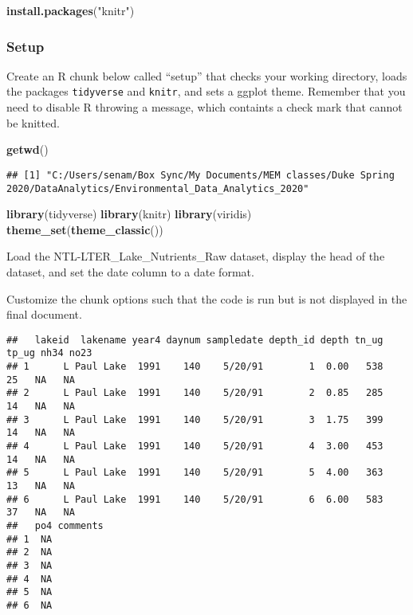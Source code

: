 \documentclass[
]{article}
\newenvironment{Shaded}{\begin{snugshade}}{\end{snugshade}}
\newcommand{\KeywordTok}[1]{\textcolor[rgb]{0.13,0.29,0.53}{\textbf{#1}}}
\newcommand{\NormalTok}[1]{#1}
\newcommand{\StringTok}[1]{\textcolor[rgb]{0.31,0.60,0.02}{#1}}
\begin{document}
\begin{Shaded}
\begin{Highlighting}[]
\KeywordTok{install.packages}\NormalTok{(}\StringTok{"knitr"}\NormalTok{)}
\end{Highlighting}
\end{Shaded}

\hypertarget{setup}{%
\subsubsection{Setup}\label{setup}}

Create an R chunk below called ``setup'' that checks your working
directory, loads the packages \texttt{tidyverse} and \texttt{knitr}, and
sets a ggplot theme. Remember that you need to disable R throwing a
message, which containts a check mark that cannot be knitted.

\begin{Shaded}
\begin{Highlighting}[]
\KeywordTok{getwd}\NormalTok{()}
\end{Highlighting}
\end{Shaded}

\begin{verbatim}
## [1] "C:/Users/senam/Box Sync/My Documents/MEM classes/Duke Spring 2020/DataAnalytics/Environmental_Data_Analytics_2020"
\end{verbatim}

\begin{Shaded}
\begin{Highlighting}[]
\KeywordTok{library}\NormalTok{(tidyverse)}
\KeywordTok{library}\NormalTok{(knitr)}
\KeywordTok{library}\NormalTok{(viridis)}
\KeywordTok{theme_set}\NormalTok{(}\KeywordTok{theme_classic}\NormalTok{())}
\end{Highlighting}
\end{Shaded}

Load the NTL-LTER\_Lake\_Nutrients\_Raw dataset, display the head of the
dataset, and set the date column to a date format.

Customize the chunk options such that the code is run but is not
displayed in the final document.

\begin{verbatim}
##   lakeid  lakename year4 daynum sampledate depth_id depth tn_ug tp_ug nh34 no23
## 1      L Paul Lake  1991    140    5/20/91        1  0.00   538    25   NA   NA
## 2      L Paul Lake  1991    140    5/20/91        2  0.85   285    14   NA   NA
## 3      L Paul Lake  1991    140    5/20/91        3  1.75   399    14   NA   NA
## 4      L Paul Lake  1991    140    5/20/91        4  3.00   453    14   NA   NA
## 5      L Paul Lake  1991    140    5/20/91        5  4.00   363    13   NA   NA
## 6      L Paul Lake  1991    140    5/20/91        6  6.00   583    37   NA   NA
##   po4 comments
## 1  NA         
## 2  NA         
## 3  NA         
## 4  NA         
## 5  NA         
## 6  NA
\end{verbatim}
\end{document}
